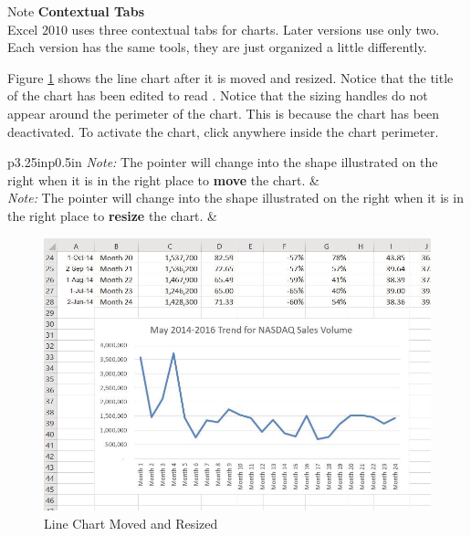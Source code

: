 \begin{center}
	\begin{infobox}{Note}
		\textbf{Contextual Tabs}
		\\
		Excel $ 2010 $ uses three contextual tabs for charts. Later versions use only two. Each version has the same tools, they are just organized a little differently.\\
	\end{infobox}
\end{center}

Figure \ref{04:fig04} shows the line chart after it is moved and resized. Notice that the title of the chart has been edited to read . Notice that the sizing handles do not appear around the perimeter of the chart. This is because the chart has been deactivated. To activate the chart, click anywhere inside the chart perimeter.

\begin{tabular}{p{3.25in}p{0.5in}} %
	\hline
	\textit{Note:} The pointer will change into the shape illustrated on the right when it is in the right place to \textbf{move} the chart. &  \\
	\hline
	\textit{Note:} The pointer will change into the shape illustrated on the right when it is in the right place to \textbf{resize} the chart. &  \\
	\hline
\end{tabular}

\begin{figure}[H]
	\centering
	\includegraphics[width=\maxwidth{.95\linewidth}]{gfx/ch04_fig04}
	\caption{Line Chart Moved and Resized}
	\label{04:fig04}
\end{figure}

